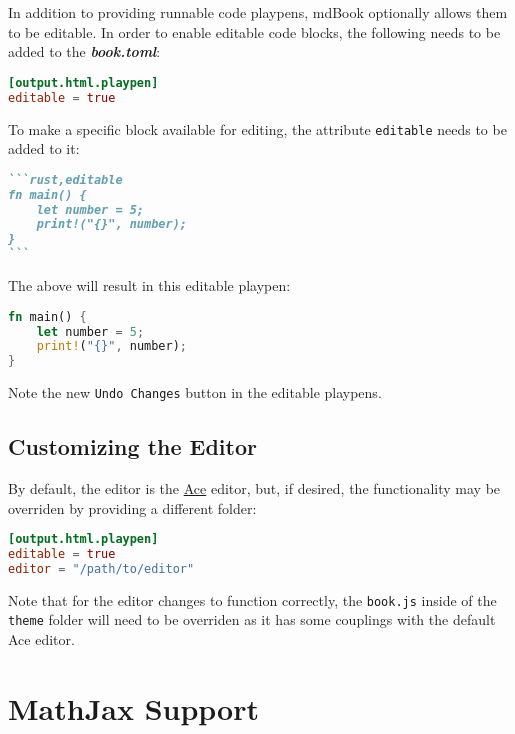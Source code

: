 \documentclass{article}
\begin{document}
In addition to providing runnable code playpens, mdBook optionally allows them
to be editable. In order to enable editable code blocks, the following needs to
be added to the \emph{\textbf{book.toml}}:\\
\begin{lstlisting}[language=toml]
[output.html.playpen]
editable = true

\end{lstlisting}

To make a specific block available for editing, the attribute \lstinline|editable| needs
to be added to it:\\
\begin{lstlisting}[language=markdown]```rust,editable
fn main() {
    let number = 5;
    print!("{}", number);
}
```\end{lstlisting}

The above will result in this editable playpen:\\
\begin{lstlisting}[language=rust]
fn main() {
    let number = 5;
    print!("{}", number);
}

\end{lstlisting}

Note the new \lstinline|Undo Changes| button in the editable playpens.\\

\subsection{Customizing the Editor}
\label{Customizing the Editor}
\label{customizing-the-editor}

By default, the editor is the \href{https://ace.c9.io/}{Ace} editor, but, if desired,
the functionality may be overriden by providing a different folder:\\
\begin{lstlisting}[language=toml]
[output.html.playpen]
editable = true
editor = "/path/to/editor"

\end{lstlisting}

Note that for the editor changes to function correctly, the \lstinline|book.js| inside of
the \lstinline|theme| folder will need to be overriden as it has some couplings with the
default Ace editor.\\

\section{MathJax Support}
\label{MathJax Support}
\label{math-jax-support}
\end{document}
